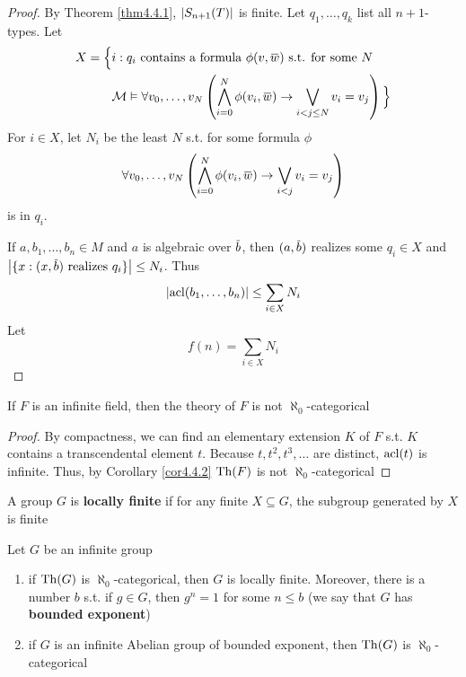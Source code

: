 \documentclass[11pt]{article}
\begin{document}
\begin{proof}
By Theorem \ref{thm4.4.1}, \(\abs{S_{n+1}(T)}\) is finite. Let \(q_1,\dots,q_k\) list
all \(n+1\)-types. Let
\begin{align*}
X=\Big\{&i:q_i\text{ contains a formula }\phi(v,\barw)\text{ s.t. for some }N\\
&\calm\vDash\forall v_0,\dots,v_N\left(\bigwedge_{i=0}^N\phi(v_i,\barw)\to\bigvee_{i<j\le N}v_i=v_j\right)\Big\}
\end{align*}
For \(i\in X\), let \(N_i\) be the least \(N\) s.t. for some formula \(\phi\)
\begin{equation*}
\forall v_0,\dots,v_N\left(\bigwedge_{i=0}^N\phi(v_i,\barw)\to\bigvee_{i<j}v_i=v_j \right)
\end{equation*}
is in \(q_i\).

If \(a,b_1,\dots,b_n\in M\) and \(a\) is algebraic over \(\barb\), then \((a,\barb)\) realizes
some \(q_i\in X\) and \(\abs{\{x:(x,\barb)\text{ realizes }q_i\}}\le N_i\). Thus
\begin{equation*}
\abs{\acl(b_1,\dots,b_n)}\le\sum_{i\in X}N_i
\end{equation*}
Let
\begin{equation*}
f(n)=\sum_{i\in X}N_i
\end{equation*}
\end{proof}

\begin{corollary}[]
If \(F\) is an infinite field, then the theory of \(F\) is not \(\aleph_0\)-categorical
\end{corollary}

\begin{proof}
By compactness, we can find an elementary extension \(K\) of \(F\) s.t. \(K\) contains a
transcendental element \(t\). Because \(t,t^2,t^3,\dots\)  are distinct, \(\operatorname{acl}(t)\) is infinite.
Thus, by Corollary \ref{cor4.4.2} \(\operatorname{Th}(F)\) is not \(\aleph_0\)-categorical
\end{proof}

A group \(G\) is \textbf{locally finite} if for any finite \(X\subseteq G\), the subgroup generated by \(X\) is
finite

\begin{corollary}[]
Let \(G\) be an infinite group
\begin{enumerate}
\item if \(\operatorname{Th}(G)\) is \(\aleph_0\)-categorical, then \(G\) is locally finite. Moreover, there is a
number \(b\) s.t. if \(g\in G\), then \(g^n=1\) for some \(n\le b\) (we say that \(G\) has
\textbf{bounded exponent})
\item if \(G\) is an infinite Abelian group of bounded exponent, then \(\operatorname{Th}(G)\)
is \(\aleph_0\)-categorical
\end{enumerate}
\end{corollary}
\end{document}
